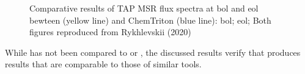 \begin{figure}[htpb]
    \centering
    \caption[Comparative results of TAP MSR flux spectra at BOL and EOL between \SaltProc and ChemTriton]{
        Comparative results of TAP MSR flux spectra at \Gls{bol} and \Gls{eol} bewteen
        \SaltProc (yellow line) and ChemTriton (blue line):
         \Gls{bol};
         \Gls{eol};
        Both figures reproduced from Rykhlevskii (2020) \cite{rykhlevskii_fuel_2020}
    }
    \label{fig:tap-spectra}
\end{figure}

While \SaltProc has not been compared to \SCALE or \ADDER, the discussed results verify
that \SaltProc produces results that are comparable to those of similar tools.


